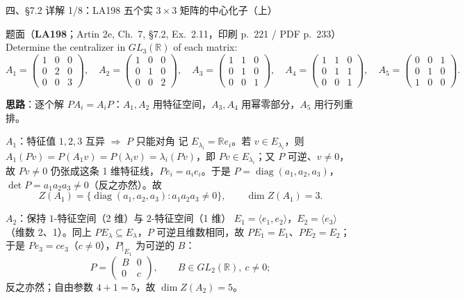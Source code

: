 \documentclass[aspectratio=169,10pt,fontset=none]{ctexbeamer}
\newcommand{\ex}[1]{\textcolor{accent}{\footnotesize\bfseries #1}}
\newcommand{\key}[1]{\textcolor{ink}{\bfseries #1}}
\begin{document}

\begin{frame}[t]{四、\S7.2 详解 1/8：LA198 五个实 $3\times3$ 矩阵的中心化子（上）}
\label{ex:LA198}
\scriptsize
\begin{block}{\footnotesize 题面（\ex{LA198}；Artin 2e, Ch.~7, \S7.2, Ex.~2.11，印刷 p.~221 / PDF p.~233）}
Determine the centralizer in $GL_3(\mathbb R)$ of each matrix:
\[
A_1=\begin{pmatrix}1&0&0\\0&2&0\\0&0&3\end{pmatrix},\quad
A_2=\begin{pmatrix}1&0&0\\0&1&0\\0&0&2\end{pmatrix},\quad
A_3=\begin{pmatrix}1&1&0\\0&1&0\\0&0&1\end{pmatrix},\quad
A_4=\begin{pmatrix}1&1&0\\0&1&1\\0&0&1\end{pmatrix},\quad
A_5=\begin{pmatrix}0&0&1\\0&1&0\\1&0&0\end{pmatrix}.
\]
\end{block}
\key{思路}：逐个解 $PA_i=A_iP$：$A_1,A_2$ 用特征空间，$A_3,A_4$ 用幂零部分，$A_5$ 用行列重排。
\begin{block}{\footnotesize $A_1$：特征值 $1,2,3$ 互异 $\Rightarrow$ $P$ 只能对角}
记 $E_{\lambda_i}=\mathbb R e_i$。若 $v\in E_{\lambda_i}$，则 $A_1(Pv)=P(A_1v)=P(\lambda_i v)=\lambda_i(Pv)$，即 $Pv\in E_{\lambda_i}$；又 $P$ 可逆、$v\ne0$，故 $Pv\ne0$ 仍张成这条 1 维特征线，$Pe_i=a_ie_i$。于是 $P=\operatorname{diag}(a_1,a_2,a_3)$，$\det P=a_1a_2a_3\ne0$（反之亦然）。故
\[
Z(A_1)=\{\operatorname{diag}(a_1,a_2,a_3):a_1a_2a_3\ne0\},\qquad \dim Z(A_1)=3.
\]
\end{block}
\begin{block}{\footnotesize $A_2$：保持 $1$-特征空间（2 维）与 $2$-特征空间（1 维）}
$E_1=\langle e_1,e_2\rangle$，$E_2=\langle e_3\rangle$（维数 2、1）。同上 $PE_\lambda\subseteq E_\lambda$，$P$ 可逆且维数相同，故 $PE_1=E_1$、$PE_2=E_2$；于是 $Pe_3=ce_3$（$c\ne0$），$P|_{E_1}$ 为可逆的 $B$：
\[
P=\begin{pmatrix}B&0\\0&c\end{pmatrix},\qquad B\in GL_2(\mathbb R),\ c\ne0;
\]
反之亦然；自由参数 $4+1=5$，故 $\dim Z(A_2)=5$。
\end{block}
\end{frame}
\end{document}
